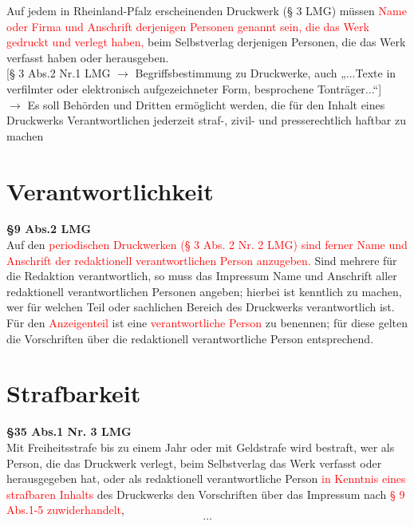 Auf jedem in Rheinland-Pfalz erscheinenden Druckwerk (§ 3 LMG) müssen \textcolor{red}{Name oder Firma und Anschrift derjenigen Personen genannt sein, die das Werk gedruckt und verlegt haben,} beim Selbstverlag derjenigen Personen, die das Werk verfasst haben oder herausgeben.\\

[§ 3 Abs.2 Nr.1 LMG $\rightarrow$ Begriffsbestimmung zu Druckwerke, auch „...Texte in verfilmter oder elektronisch aufgezeichneter Form, besprochene Tonträger...“]\\

$\rightarrow$ Es soll Behörden und Dritten ermöglicht werden, die für den Inhalt eines Druckwerks Verantwortlichen jederzeit straf-, zivil- und presserechtlich haftbar zu machen
%
%
%
\section{Verantwortlichkeit}
\textbf{§9 Abs.2 LMG}\\

Auf den \textcolor{red}{periodischen Druckwerken (§ 3 Abs. 2 Nr. 2 LMG) sind ferner Name und Anschrift der redaktionell verantwortlichen Person anzugeben.} Sind mehrere für die Redaktion verantwortlich, so muss das Impressum Name und Anschrift aller redaktionell verantwortlichen Personen angeben; hierbei ist kenntlich zu machen, wer für welchen Teil oder sachlichen Bereich des Druckwerks verantwortlich ist.\\

Für den \textcolor{red}{Anzeigenteil} ist eine \textcolor{red}{verantwortliche Person} zu benennen; für diese gelten die Vorschriften über die redaktionell verantwortliche Person entsprechend.
%
%
%
\section{Strafbarkeit}
\textbf{§35 Abs.1 Nr. 3 LMG}\\
Mit Freiheitsstrafe bis zu einem Jahr oder mit Geldstrafe wird bestraft, wer als Person, die das Druckwerk verlegt, beim Selbstverlag das Werk verfasst oder herausgegeben hat, oder als redaktionell verantwortliche Person \textcolor{red}{in Kenntnis eines strafbaren Inhalts} des Druckwerks den Vorschriften über das Impressum nach \textcolor{red}{§ 9 Abs.1-5 zuwiderhandelt},\\
\[ \dots \]
%
%
%
